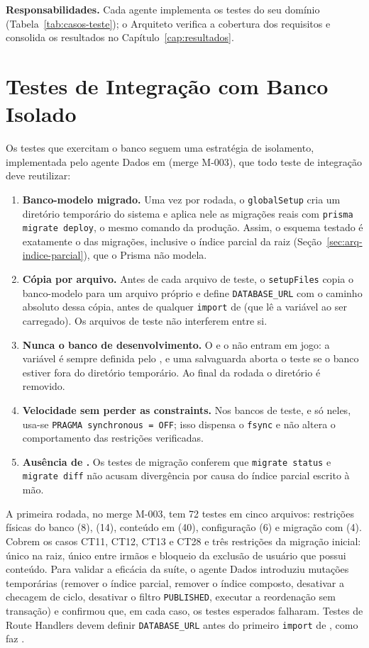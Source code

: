 \textbf{Responsabilidades.} Cada agente implementa os testes do seu domínio (Tabela~\ref{tab:casos-teste}); o Arquiteto verifica a cobertura dos requisitos e consolida os resultados no Capítulo~\ref{cap:resultados}.

\section{Testes de Integração com Banco Isolado}\label{sec:testes-banco}

Os testes que exercitam o banco seguem uma estratégia de isolamento, implementada pelo agente Dados em  (merge M-003), que todo teste de integração deve reutilizar:

\begin{enumerate}
  \item \textbf{Banco-modelo migrado.} Uma vez por rodada, o \texttt{globalSetup} cria um diretório temporário do sistema e aplica nele as migrações reais com \texttt{prisma migrate deploy}, o mesmo comando da produção. Assim, o esquema testado é exatamente o das migrações, inclusive o índice parcial da raiz (Seção~\ref{sec:arq-indice-parcial}), que o Prisma não modela.
  \item \textbf{Cópia por arquivo.} Antes de cada arquivo de teste, o \texttt{setupFiles} copia o banco-modelo para um arquivo próprio e define \texttt{DATABASE\_URL} com o caminho absoluto dessa cópia, antes de qualquer \texttt{import} de  (que lê a variável ao ser carregado). Os arquivos de teste não interferem entre si.
  \item \textbf{Nunca o banco de desenvolvimento.} O  e o  não entram em jogo: a variável é sempre definida pelo , e uma salvaguarda aborta o teste se o banco estiver fora do diretório temporário. Ao final da rodada o diretório é removido.
  \item \textbf{Velocidade sem perder as constraints.} Nos bancos de teste, e só neles, usa-se \texttt{PRAGMA synchronous = OFF}; isso dispensa o \texttt{fsync} e não altera o comportamento das restrições verificadas.
  \item \textbf{Ausência de .} Os testes de migração conferem que \texttt{migrate status} e \texttt{migrate diff} não acusam divergência por causa do índice parcial escrito à mão.
\end{enumerate}

A primeira rodada, no merge M-003, tem 72 testes em cinco arquivos: restrições físicas do banco (8),  (14), conteúdo em  (40), configuração (6) e migração com  (4). Cobrem os casos CT11, CT12, CT13 e CT28 e três restrições da migração inicial:  único na raiz,  único entre irmãos e bloqueio da exclusão de usuário que possui conteúdo. Para validar a eficácia da suíte, o agente Dados introduziu mutações temporárias (remover o índice parcial, remover o índice composto, desativar a checagem de ciclo, desativar o filtro \texttt{PUBLISHED}, executar a reordenação sem transação) e confirmou que, em cada caso, os testes esperados falharam. Testes de Route Handlers devem definir \texttt{DATABASE\_URL} antes do primeiro \texttt{import} de , como faz .

